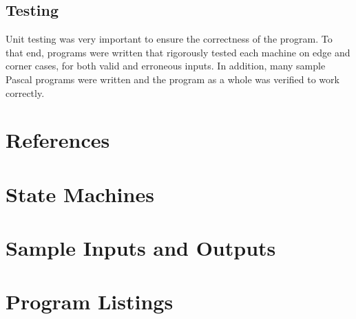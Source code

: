\documentclass[titlepage]{article}
\begin{document}
		\subsection{Testing}
			Unit testing was very important to ensure the correctness of the program. To that end, programs were written that rigorously tested each machine on edge and corner cases, for both valid and erroneous inputs. In addition, many sample Pascal programs were written and the program as a whole was verified to work correctly.
	\section{References}
	\appendix
	\section{State Machines}
	\section{Sample Inputs and Outputs}
		
		
	\section{Program Listings}
		
		
		
		
		
\end{document}
